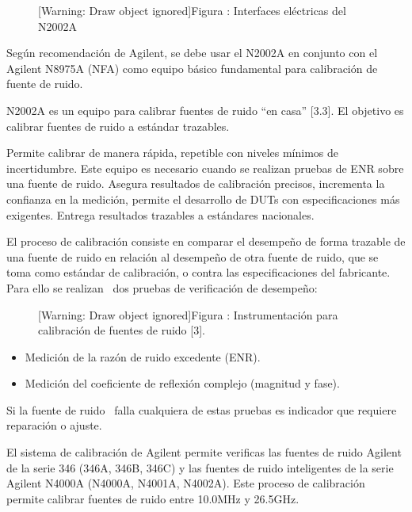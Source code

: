 \documentclass[paper=letter,oneside,fontsize=10pt,parskip=full]{article}
\newcounter{Drawing}
\renewcommand\theDrawing{\arabic{Drawing}}
\begin{document}
\begin{figure}
\centering
\begin{minipage}{18.119cm}
[Warning: Draw object ignored]Figura {\theDrawing\label{seq:refDrawing3}}: Interfaces eléctricas
del N2002A
\end{minipage}
\end{figure}
Según recomendación de Agilent, se debe usar el N2002A en conjunto con el Agilent N8975A (NFA) como equipo básico
fundamental para calibración de fuente de ruido. 

N2002A es un equipo para calibrar fuentes de ruido “en casa” [3.3]. El objetivo es calibrar fuentes de ruido a estándar
trazables.

Permite calibrar de manera rápida, repetible con niveles mínimos de incertidumbre. Este equipo es necesario cuando se
realizan pruebas de ENR sobre una fuente de ruido. Asegura resultados de calibración precisos, incrementa la confianza
en la medición, permite el desarrollo de DUTs con especificaciones más exigentes. Entrega resultados trazables a
estándares nacionales.

El proceso de calibración consiste en comparar el desempeño de forma trazable de una fuente de ruido en relación al
desempeño de otra fuente de ruido, que se toma como estándar de calibración, o contra las especificaciones del
fabricante. Para ello se realizan \ dos pruebas de verificación de desempeño: 

\begin{figure}
\centering
\begin{minipage}{19.011cm}
[Warning: Draw object ignored]Figura {\theDrawing\label{seq:refDrawing4}}: Instrumentación para
calibración de fuentes de ruido [3].
\end{minipage}
\end{figure}
\begin{itemize}
\item Medición de la razón de ruido excedente (ENR).
\item Medición del coeficiente de reflexión complejo (magnitud y fase). 
\end{itemize}
Si la fuente de ruido \ falla cualquiera de estas pruebas es indicador que requiere reparación o ajuste.

El sistema de calibración de Agilent permite verificas las fuentes de ruido Agilent de la serie 346 (346A, 346B, 346C) y
las fuentes de ruido inteligentes de la serie Agilent N4000A (N4000A, N4001A, N4002A). Este proceso de calibración
permite calibrar fuentes de ruido entre 10.0MHz y 26.5GHz.
\end{document}
